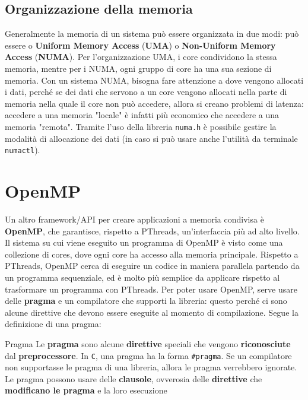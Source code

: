 \subsection{Organizzazione della memoria}

Generalmente la memoria di un sistema può essere organizzata in due modi: può essere o \textbf{Uniform Memory Access} (\textbf{UMA}) o \textbf{Non-Uniform Memory Access} (\textbf{NUMA}). Per l'organizzazione UMA, i core condividono la stessa memoria, mentre per i NUMA, ogni gruppo di core ha una sua sezione di memoria. Con un sistema NUMA, bisogna fare attenzione a dove vengono allocati i dati, perché se dei dati che servono a un core vengono allocati nella parte di memoria nella quale il core non può accedere, allora si creano problemi di latenza: accedere a una memoria "locale" è infatti più economico che accedere a una memoria "remota". Tramite l'uso della libreria \verb|numa.h| è possibile gestire la modalità di allocazione dei dati (in caso si può usare anche l'utilità da terminale \verb|numactl|).
\nwl
\section{OpenMP}

Un altro framework/API per creare applicazioni a memoria condivisa è \textbf{OpenMP}, che garantisce, rispetto a PThreads, un'interfaccia più ad alto livello. Il sistema su cui viene eseguito un programma di OpenMP è visto come una collezione di cores, dove ogni core ha accesso alla memoria principale.
\nwl
Rispetto a PThreads, OpenMP cerca di eseguire un codice in maniera parallela partendo da un programma sequenziale, ed è molto più semplice da applicare rispetto al trasformare un programma con PThreads. Per poter usare OpenMP, serve usare delle \textbf{pragma} e un compilatore che supporti la libreria: questo perché ci sono alcune direttive che devono essere eseguite al momento di compilazione. Segue la definizione di una pragma:

\begin{definition}{Pragma}
    Le \textbf{pragma} sono alcune \textbf{direttive} speciali che vengono \textbf{riconosciute} dal \textbf{preprocessore}. In \verb|C|, una pragma ha la forma \verb|#pragma|. Se un compilatore non supportasse le pragma di una libreria, allora le pragma verrebbero ignorate.
    \nwl
    Le pragma possono usare delle \textbf{clausole}, ovverosia delle \textbf{direttive} che \textbf{modificano le pragma} e la loro esecuzione
\end{definition}

